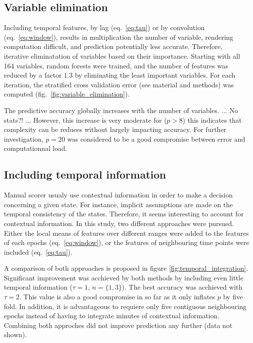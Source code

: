 \subsection{Variable elimination}
Including temporal features, by lag (eq.~\ref{eq:tau}) or by convolution (eq.~\ref{eq:window}), results in multiplication the number of variable, rendering computation difficult, and prediction potentially less accurate.
Therefore, iterative eliminatation of variables based on their importance.
Starting with all 164 variables, random forests were trained, and the number of features was reduced by a factor $1.3$  by eliminating the least important variables.
For each iteration, the stratified cross validation error (see material and methods) was computed (fig.~\ref{fig:variable_elimination}).



The predictive accuracy globally increases with the number of variables.
...
No stats?!
...
However, this increase is very moderate for ($p>8$) this indicates that complexity can be reduces without largely impacting accuracy.
For further investigation, $p=20$ was considered to be a good compromise between error and computationnal load.

\subsection{Including temporal information}
Manual scorer usualy use contextual information in order to make a decision concerning a given state.
For instance, implicit assumptions are made on the temporal consistency of the states.
Therefore, it seems interesting to account for contextual information.
In this study, two different approaches were pursued.
Either the local means of features over different ranges were added to the features of each epochs (eq.~\ref{eq:window}), 
or the features of neighbouring time points were included (eq.~\ref{eq:tau}).

A comparison of both approaches is proposed in figure \ref{fig:temporal_integration}.
Significant improvement was acchieved by both methods by including even little temporal information ($\tau = 1$, $n=\{1,3\}$).
The best accuracy was acchieved with $\tau = 2$. 
This value is also a good compromise in so far as it only inflates $p$ by five fold.
In addition, it is advantageous to requiere only five contiguous neighbouring epochs instead of having to integrate minutes of contextual information.
Combining both approches did not improve prediction any further (data not shown).

